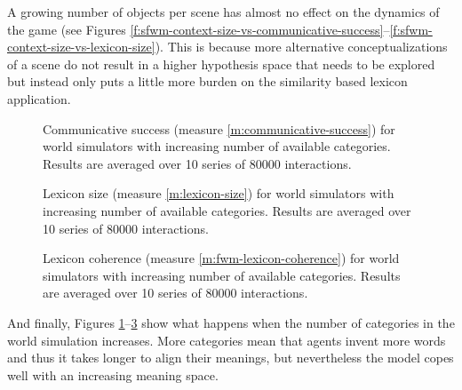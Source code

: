 A growing number of objects per scene has almost no effect
on the dynamics of the game (see Figures
\ref{f:sfwm-context-size-vs-communicative-success}--\ref{f:sfwm-context-size-vs-lexicon-size}).
This is because more alternative conceptualizations of a scene do not
result in a higher hypothesis space that needs to be explored but
instead only puts a little more burden on the similarity based lexicon
application.

\startfiguregroup

\begin{figure}[t]
  \caption{Communi\-cative success (measure
    \ref{m:communicative-success}) for world simulators with
    increasing number of available categories. Results are averaged over 10
    series of 80000 interactions. }
  \label{f:sfwm-number-of-attributes-vs-communicative-success}
\end{figure}

\begin{figure}[t]
  \caption{Lexicon size (measure \ref{m:lexicon-size}) for world
    simulators with increasing number of available categories. Results
    are averaged over 10 series of 80000 interactions. }
  \label{f:sfwm-number-of-attributes-vs-lexicon-size}
\end{figure}

\begin{figure}[t]
  \caption{Lexicon coherence (measure \ref{m:fwm-lexicon-coherence})
    for world simulators with increasing number of available
    categories. Results are averaged over 10 series of 80000
    interactions. }
  \label{f:sfwm-number-of-attributes-vs-lexicon-coherence}
\end{figure}

\stopfiguregroup

And finally, Figures
\ref{f:sfwm-number-of-attributes-vs-communicative-success}--\ref{f:sfwm-number-of-attributes-vs-lexicon-coherence}
show what happens when the number of categories in the world
simulation increases. More categories mean that agents invent more
words and thus it takes longer to align their meanings, but
nevertheless the model copes well with an increasing meaning space.




